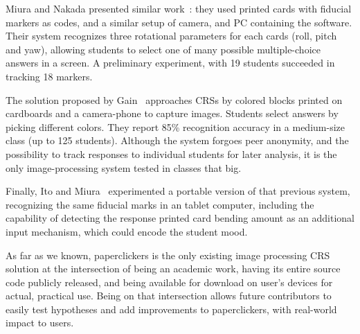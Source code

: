 Miura and Nakada presented similar work~\cite{miura2012device}: they used printed cards with fiducial markers as codes, and a similar setup of camera, and PC containing the software. Their system recognizes three rotational parameters for each cards (roll, pitch and yaw), allowing students to select one of many possible multiple-choice answers in a screen. A preliminary experiment, with 19 students succeeded in tracking 18 markers.

The solution proposed by Gain~\cite{gain2013using} approaches CRSs by colored blocks printed on cardboards and a camera-phone to capture images. Students select answers by picking different colors. They report 85\% recognition accuracy in a medium-size class (up to 125 students). Although the system forgoes peer anonymity, and the possibility to track responses to individual students for later analysis, it is the only image-processing system tested in classes that big.

Finally, Ito and Miura~\cite{ito2015portable} experimented a portable version of that previous system, recognizing the same fiducial marks in an tablet computer, including the capability of detecting the response printed card bending amount as an additional input mechanism, which could encode the student mood.

As far as we known, paperclickers is the only existing image processing CRS solution at the intersection of being an academic work, having its entire source code publicly released, and being available for download on user's devices for actual, practical use. Being on that intersection allows future contributors to easily test hypotheses and add improvements to paperclickers, with real-world impact to users.